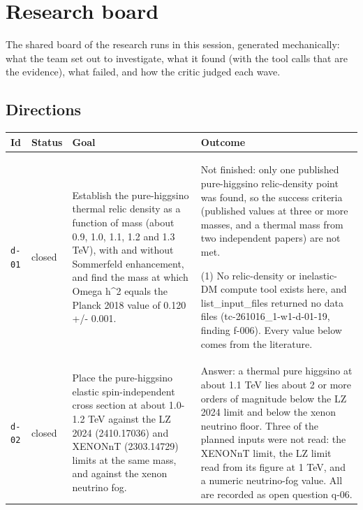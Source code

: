 \documentclass[11pt,a4paper]{article}
\begin{document}
\section{Research board}
\label{app:board}
The shared board of the research runs in this session, generated mechanically: what the team set out to investigate, what it found (with the tool calls that are the evidence), what failed, and how the critic judged each wave.
\subsection{Directions}
\begin{longtable}{@{}p{}p{}p{}p{}@{}}
\toprule Id & Status & Goal & Outcome \\ \midrule \endhead
\texttt{d-01} & closed & Establish the pure-higgsino thermal relic density as a function of mass (about 0.9, 1.0, 1.1, 1.2 and 1.3 TeV), with and without Sommerfeld enhancement, and find the mass at which Omega h\textasciicircum{}2 equals the Planck 2018 value of 0.120 +/- 0.001. & Not finished: only one published pure-higgsino relic-density point was found, so the success criteria (published values at three or more masses, and a thermal mass from two independent papers) are not met.

(1) No relic-density or inelastic-DM compute tool exists here, and list\_input\_files returned no data files (tc-261016\_1-w1-d-01-19, finding f-006). Every value below comes from the literature.  \\
\texttt{d-02} & closed & Place the pure-higgsino elastic spin-independent cross section at about 1.0-1.2 TeV against the LZ 2024 (2410.17036) and XENONnT (2303.14729) limits at the same mass, and against the xenon neutrino fog. & Answer: a thermal pure higgsino at about 1.1 TeV lies about 2 or more orders of magnitude below the LZ 2024 limit and below the xenon neutrino floor. Three of the planned inputs were not read: the XENONnT limit, the LZ limit read from its figure at 1 TeV, and a numeric neutrino-fog value. All are recorded as open question q-06.


\end{longtable}
\end{document}
